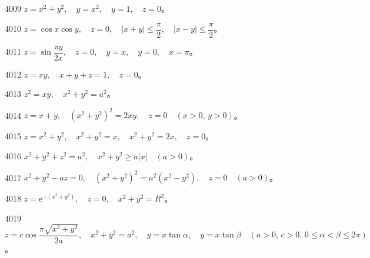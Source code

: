\begin{prob}[S]{4009}
$z = x^2 + y^2, \quad y = x^2, \quad y = 1, \quad z = 0$。
\end{prob}

\begin{prob}[S]{4010}
$z = \cos x \cos y, \quad z = 0, \quad |x + y| \leqslant \dfrac{\pi}{2}, \quad |x - y| \leqslant \dfrac{\pi}{2}$。
\end{prob}

\begin{prob}[S]{4011}
$z = \sin \dfrac{\pi y}{2x}, \quad z = 0, \quad y = x, \quad y = 0, \quad x = \pi$。
\end{prob}

\begin{prob}[S]{4012}
$z = xy, \quad x + y + z = 1, \quad z = 0$。
\end{prob}


\begin{prob}[S]{4013}
$z^2 = xy, \quad x^2 + y^2 = a^2$。
\end{prob}

\begin{prob}[S]{4014}
$z = x + y, \quad (x^2 + y^2)^2 = 2xy, \quad z = 0 \quad (x > 0, \, y > 0)$。
\end{prob}

\begin{prob}[S]{4015}
$z = x^2 + y^2, \quad x^2 + y^2 = x, \quad x^2 + y^2 = 2x, \quad z = 0$。
\end{prob}

\begin{prob}[S]{4016}
$x^2 + y^2 + z^2 = a^2, \quad x^2 + y^2 \geqslant a|x| \quad (a > 0)$。
\end{prob}

\begin{prob}[S]{4017}
$x^2 + y^2 - az = 0, \quad (x^2 + y^2)^2 = a^2(x^2 - y^2), \quad z = 0 \quad (a > 0)$。
\end{prob}

\begin{prob}[S]{4018}
$z = \mathrm{e}^{-(x^2 + y^2)}, \quad z = 0, \quad x^2 + y^2 = R^2$。
\end{prob}

\begin{prob}[S]{4019}
$z = c\cos\dfrac{\pi\sqrt{x^2 + y^2}}{2a}, \quad x^2 + y^2 = a^2, \quad y = x\tan\alpha, \quad y = x\tan\beta \quad (a > 0, \, c > 0, \, 0 \leqslant \alpha < \beta \leqslant 2\pi)$。
\end{prob}

